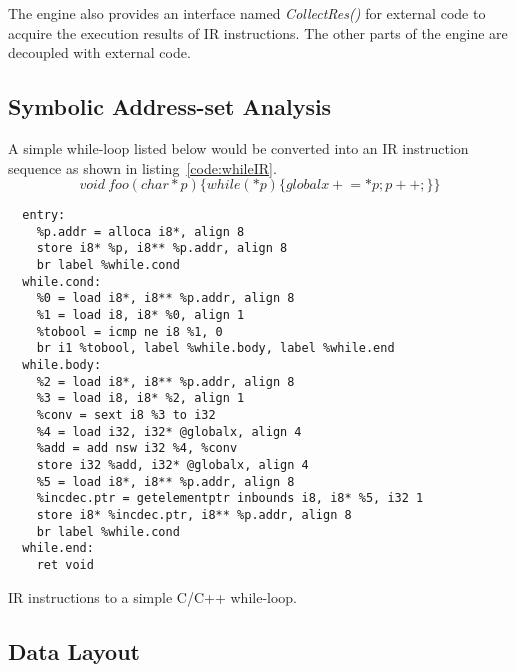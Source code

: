 The engine also provides an interface named \textit{CollectRes()} for external code to acquire
the execution results of IR instructions.
The other parts of the engine are decoupled with external code.


\subsection{Symbolic Address-set Analysis}

A simple while-loop listed below would be converted into an IR instruction sequence as shown in listing~\ref{code:whileIR}.
$$void \ foo(char *p) \{ while(*p)\{globalx \mathrel{+}= *p; p ++;\} \}$$


\begin{listing}
  \begin{verbatim}
  entry:
    %p.addr = alloca i8*, align 8
    store i8* %p, i8** %p.addr, align 8
    br label %while.cond  
  while.cond:
    %0 = load i8*, i8** %p.addr, align 8
    %1 = load i8, i8* %0, align 1
    %tobool = icmp ne i8 %1, 0
    br i1 %tobool, label %while.body, label %while.end
  while.body:    
    %2 = load i8*, i8** %p.addr, align 8
    %3 = load i8, i8* %2, align 1
    %conv = sext i8 %3 to i32
    %4 = load i32, i32* @globalx, align 4
    %add = add nsw i32 %4, %conv
    store i32 %add, i32* @globalx, align 4
    %5 = load i8*, i8** %p.addr, align 8
    %incdec.ptr = getelementptr inbounds i8, i8* %5, i32 1
    store i8* %incdec.ptr, i8** %p.addr, align 8
    br label %while.cond  
  while.end:
    ret void
\end{verbatim}
  \caption{IR instructions to a simple C/C++ while-loop.}
  \label{code:whileIR}
\end{listing}

\subsection{Data Layout}








